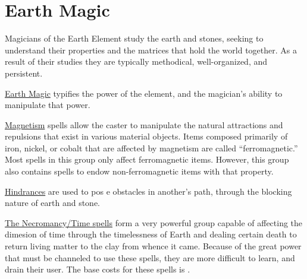 \chapter{Earth Magic}
\label{ch:elemental-earth-magic}

Magicians of the Earth Element study the earth and stones, seeking to understand their properties and the matrices that hold the world together. As a result of their studies they are typically methodical, well-organized, and persistent.

\ul{Earth Magic} typifies the power of the element, and the magician’s ability to manipulate that power.

\ul{Magnetism} spells allow the caster to manipulate the natural attractions and repulsions that exist in various material objects. Items composed primarily of iron, nickel, or cobalt that are affected by magnetism are called “ferromagnetic.” Most spells in this group only affect ferromagnetic items. However, this group also contains spells to endow non-ferromagnetic items with that property.

\ul{Hindrances} are used to pos e obstacles in another’s path, through the blocking nature of earth and stone.

\ul{The Necromancy/Time spells} form a very powerful group capable of affecting the dimesion of time through the timelessness of Earth and dealing certain death to return living matter to the clay from whence it came. Because of the great power that must be channeled to use these spells, they are more difficult to learn, and drain their user. The base costs for these spells is .

